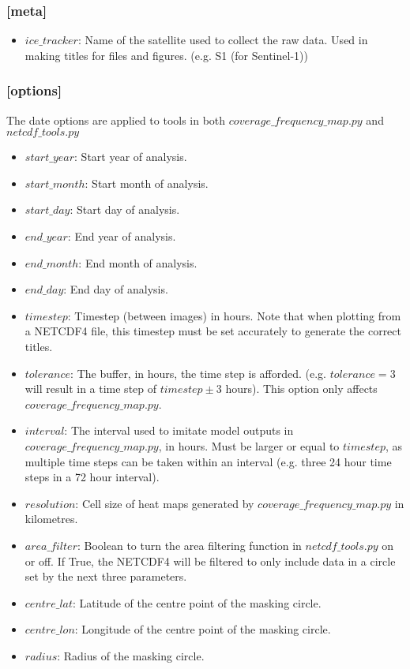 \documentclass[12pt]{article}
\begin{document}
\subsubsection*{[meta]}

\begin{itemize}
    \item $ice\_tracker$: Name of the satellite used to collect the raw data. Used in making titles for files and figures. (e.g. S1 (for Sentinel-1))
\end{itemize}

\subsubsection*{[options]}

The date options are applied to tools in both $coverage\_frequency\_map.py$ and $netcdf\_tools.py$
\begin{itemize}
    \item $start\_year$: Start year of analysis. 
    \item $start\_month$: Start month of analysis.
    \item $start\_day$: Start day of analysis.
    \item $end\_year$: End year of analysis.
    \item $end\_month$: End month of analysis.
    \item $end\_day$: End day of analysis.
    \item $timestep$: Timestep (between images) in hours. Note that when plotting from a NETCDF4 file, this timestep must be set accurately to generate the correct titles.
    \item $tolerance$: The buffer, in hours, the time step is afforded. (e.g. $tolerance = 3$ will result in a time step of $timestep \pm 3$ hours). This option only affects $coverage\_frequency\_map.py$.
    \item $interval$: The interval used to imitate model outputs in $coverage\_frequency\_map.py$, in hours. Must be larger or equal to $timestep$, as multiple time steps can be taken within an interval (e.g. three 24 hour time steps in a 72 hour interval).
    \item $resolution$: Cell size of heat maps generated by $coverage\_frequency\_map.py$ in kilometres.
    \item $area\_filter$: Boolean to turn the area filtering function in $netcdf\_tools.py$ on or off. If True, the NETCDF4 will be filtered to only include data in a circle set by the next three parameters.
    \item $centre\_lat$: Latitude of the centre point of the masking circle.
    \item $centre\_lon$: Longitude of the centre point of the masking circle.
    \item $radius$: Radius of the masking circle.
\end{itemize}
\end{document}

